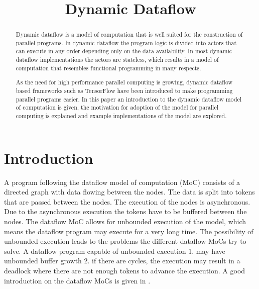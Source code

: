 \documentclass[conference,a4paper]{IEEEtran}
\begin{document}
%
\title{Dynamic Dataflow}

\author{
}

\maketitle

\begin{abstract}
Dynamic dataflow is a model of computation that is well suited for the
construction of parallel programs. In dynamic dataflow the program logic is
divided into actors that can execute in any order depending only on the data
availability. In most dynamic dataflow implementations the actors are stateless,
which results in a model of computation that resembles functional programming in
many respects. 

As the need for high performance parallel computing is growing, dynamic dataflow
based frameworks such as TensorFlow have been introduced to make programming
parallel programs easier. In this paper an introduction to the dynamic dataflow
model of computation is given, the motivation for adoption of the model for
parallel computing is explained and example implementations of the model are
explored.
\end{abstract}

\section{Introduction}
A program following the dataflow model of computation (MoC) consists of a
directed graph with data flowing between the nodes. The data is split into
tokens that are passed between the nodes. The execution of the nodes is
asynchronous. Due to the asynchronous execution the tokens have to be buffered
between the nodes. The dataflow MoC allows for unbounded execution of the model,
which means the dataflow program may execute for a very long time. The
possibility of unbounded execution leads to the problems the different dataflow
MoCs try to solve. A dataflow program capable of unbounded execution 1. may have
unbounded buffer growth 2. if there are cycles, the execution may result in a
deadlock where there are not enough tokens to advance the execution. A good
introduction on the dataflow MoCs is given in \cite{lee2015introduction}.
\end{document}
